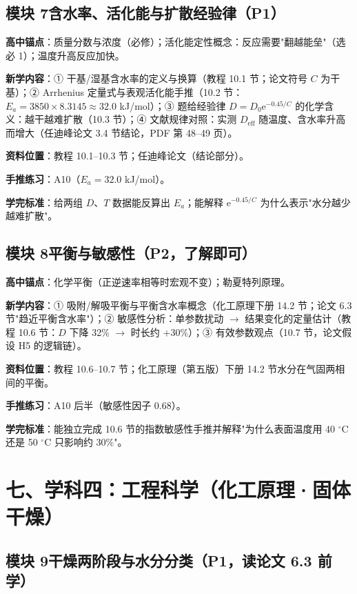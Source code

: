 \documentclass[12pt,a4paper]{ctexart}
\begin{document}
\subsection{模块 7\quad 含水率、活化能与扩散经验律（P1）}

\textbf{高中锚点}：质量分数与浓度（必修）；活化能定性概念：反应需要"翻越能垒"（选必 1）；温度升高反应加快。

\textbf{新学内容}：① 干基/湿基含水率的定义与换算（教程 10.1 节；论文符号 $C$ 为干基）；② Arrhenius 定量式与表观活化能手推（10.2 节：$E_a=3850\times8.3145\approx32.0$ kJ/mol）；③ 题给经验律 $D=D_0\mathrm{e}^{-0.45/C}$ 的化学含义：越干越难扩散（10.3 节）；④ 文献规律对照：实测 $D_{\mathrm{eff}}$ 随温度、含水率升高而增大（任迪峰论文 3.4 节结论，PDF 第 48--49 页）。

\textbf{资料位置}：教程 10.1--10.3 节；任迪峰论文（结论部分）。

\textbf{手推练习}：A10（$E_a=32.0$ kJ/mol）。

\textbf{学完标准}：给两组 $D$、$T$ 数据能反算出 $E_a$；能解释 $\mathrm{e}^{-0.45/C}$ 为什么表示"水分越少越难扩散"。

\subsection{模块 8\quad 平衡与敏感性（P2，了解即可）}

\textbf{高中锚点}：化学平衡（正逆速率相等时宏观不变）；勒夏特列原理。

\textbf{新学内容}：① 吸附/解吸平衡与平衡含水率概念（化工原理下册 14.2 节；论文 6.3 节"趋近平衡含水率"）；② 敏感性分析：单参数扰动 $\to$ 结果变化的定量估计（教程 10.6 节：$D$ 下降 32\% $\to$ 时长约 $+30\%$）；③ 有效参数观点（10.7 节，论文假设 H5 的逻辑链）。

\textbf{资料位置}：教程 10.6--10.7 节；化工原理（第五版）下册 14.2 节水分在气固两相间的平衡。

\textbf{手推练习}：A10 后半（敏感性因子 $0.68$）。

\textbf{学完标准}：能独立完成 10.6 节的指数敏感性手推并解释"为什么表面温度用 40 $^\circ$C 还是 50 $^\circ$C 只影响约 30\%"。

\section{七、学科四：工程科学（化工原理·固体干燥）}

\subsection{模块 9\quad 干燥两阶段与水分分类（P1，读论文 6.3 前学）}
\end{document}
